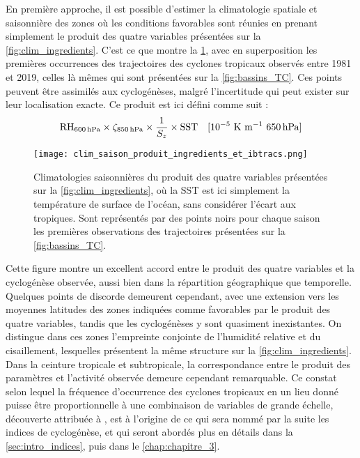 \documentclass[../main.tex]{subfiles}
\begin{document}
En première approche, il est possible d'estimer la climatologie spatiale et saisonnière des zones où les conditions favorables sont réunies en prenant
simplement le produit des quatre variables présentées sur la \cref{fig:clim_ingredients}. C'est ce que montre la \cref{fig:produit_ingredients}, avec en
superposition les premières occurrences des trajectoires des cyclones tropicaux observés entre 1981 et 2019, celles là mêmes qui sont présentées sur la
\cref{fig:bassins_TC}. Ces points peuvent être assimilés aux cyclogénèses, malgré l'incertitude qui peut exister sur leur localisation exacte. Ce produit est
ici défini comme suit :
%
\begin{equation*}
    \text{RH}_{\hPa{600}} \times \zeta_{\hPa{850}} \times \frac{1}{S_z} \times \text{SST} \quad \text{[$10^{-5}$ K m$^{-1}$ \hPa{650}}]
\end{equation*}
%
\begin{figure}[tbp]
    \centering
    \texttt{[image: clim\_saison\_produit\_ingredients\_et\_ibtracs.png]}
    \caption{Climatologies saisonnières du produit des quatre variables présentées sur la \cref{fig:clim_ingredients}, où la SST est ici simplement la
    température de surface de l'océan, sans considérer l'écart aux tropiques. Sont représentés par des points noirs pour chaque saison les premières
    observations des trajectoires présentées sur la \cref{fig:bassins_TC}.}
    \label{fig:produit_ingredients}
\end{figure}
%
Cette figure montre un excellent accord entre le produit des quatre variables et la cyclogénèse observée, aussi bien dans la répartition géographique que
temporelle. Quelques points de discorde demeurent cependant, avec une extension vers les moyennes latitudes des zones indiquées comme favorables par le produit
des quatre variables, tandis que les cyclogénèses y sont quasiment inexistantes. On distingue dans ces zones l'empreinte conjointe de l'humidité relative et du
cisaillement, lesquelles présentent la même structure sur la \cref{fig:clim_ingredients}. Dans la ceinture tropicale et subtropicale, la correspondance entre
le produit des paramètres et l'activité observée demeure cependant remarquable. Ce constat selon lequel la fréquence d'occurrence des cyclones tropicaux en un
lieu donné puisse être proportionnelle à une combinaison de variables de grande échelle, découverte attribuée à \textcite{gray_tropical_1975}, est à l'origine de ce
qui sera nommé par la suite les indices de cyclogénèse, et qui seront abordés plus en détails dans la \cref{sec:intro_indices}, puis dans le
\cref{chap:chapitre_3}.
\end{document}
